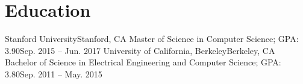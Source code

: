 \section{Education}
  \resumeSubHeadingListStart
    \resumeSubheading
      {Stanford University}{Stanford, CA}
      {Master of Science in Computer Science;  GPA: 3.90}{Sep. 2015 -- Jun. 2017}
    \resumeSubheading
      {University of California, Berkeley}{Berkeley, CA}
      {Bachelor of Science in Electrical Engineering and Computer Science;  GPA: 3.80}{Sep. 2011 -- May. 2015}
  \resumeSubHeadingListEnd